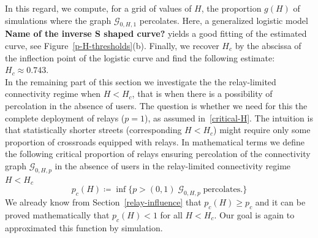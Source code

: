 \documentclass[conference]{IEEEtran}
\begin{document}
In this regard, we compute, for a grid of values of $H$, the proportion $g(H)$ of simulations where the graph $\mathcal{G}_{0,H,1}$ percolates. Here, a generalized logistic model \textbf{Name of the inverse S shaped curve?} yields a good fitting of the estimated curve, see Figure~\ref{p-H-thresholds}(b). Finally, we recover $H_{c}$ by the abscissa of the inflection point of the logistic curve and find the following estimate: $H_c \approx 0.743$. \\

\indent In the remaining part of this section we investigate the 
the relay-limited connectivity regime 
when $H < H_c$, that is when there is a possibility of percolation in the absence of users. The question is whether we need for this the complete deployment of  
relays ($p=1$), as assumed in~\eqref{critical-H}.
The intuition is that statistically shorter streets (corresponding $H<H_c$) might require only some proportion of crossroads equipped with relays. In mathematical terms we define the following critical proportion of relays ensuring percolation of the connectivity graph $\mathcal{G}_{0,H,p}$ in the absence of users in the relay-limited connectivity regime  $H<H_c$
\begin{equation}
    \label{p_c(H)}
    p_c(H) \coloneqq \inf \lbrace p>(0,1) \; \mathcal{G}_{0,H,p} \; \text{percolates}. \rbrace
\end{equation}
We already know from Section~\ref{relay-influence} that 
$p_c(H)\ge p_c$ and it can be proved mathematically that $p_c(H)<1$ for all $H<H_c$. Our goal is again to approximated this function by simulation.
\end{document}
